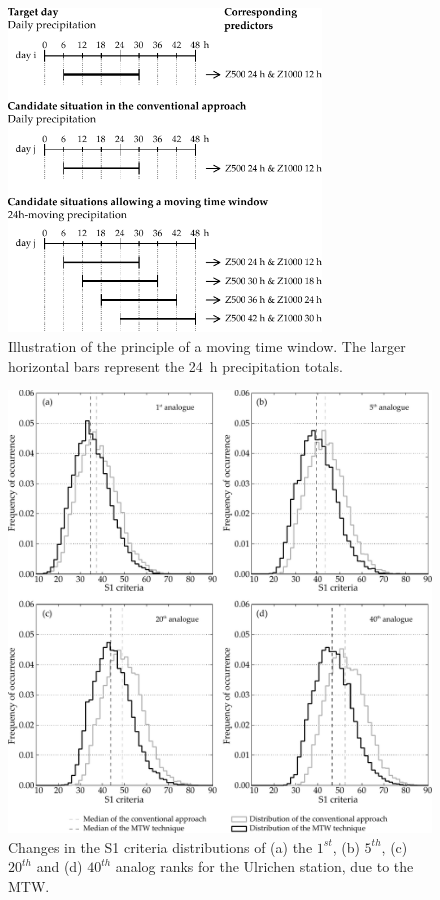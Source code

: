\documentclass[hess, manuscript]{copernicus}
\begin{document}
\begin{figure}[htb]
	\begin{center}
		\includegraphics[width=8.3cm]{figures/illustration_moving_window.pdf}
	\end{center}
	\caption{Illustration of the principle of a moving time window. The larger horizontal bars represent the 24~h precipitation totals.}
	\label{fig:principle}
\end{figure}

\begin{figure}[htb]
	\begin{center}
		\includegraphics[width=15cm]{figures/changes_S1_analogues.pdf}
	\end{center}
	\caption{Changes in the S1 criteria distributions of (a) the $1^{st}$, (b) $5^{th}$, (c) $20^{th}$ and (d) $40^{th}$ analog ranks for the Ulrichen station, due to the MTW.}
	\label{fig:changes_S1_analogs}
\end{figure}
\end{document}

